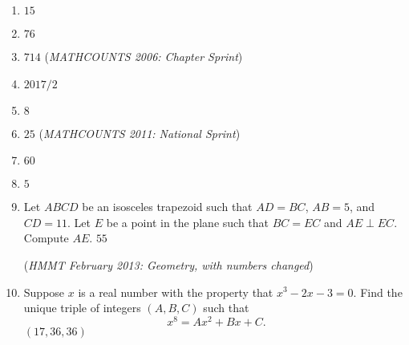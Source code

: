\documentclass{article}
\begin{document}
\begin{enumerate}
\item $15$\vspace{1cm}
\item $76$\vspace{1cm}
\item $714$ (\emph{MATHCOUNTS 2006: Chapter Sprint})\vspace{1cm}
\item $2017/2$\vspace{1cm}
\item $8$\vspace{1cm}
\item $25$ (\emph{MATHCOUNTS 2011: National Sprint})\vspace{1cm}
\item $60$\vspace{1cm}
\item $5$\vspace{1cm}
\item Let $ABCD$ be an isosceles trapezoid such that $AD = BC$, $AB = 5$, and $CD = 11$. Let $E$ be a point in the plane such that $BC = EC$ and $AE\perp EC$. Compute $AE$. $\boxed{55}$\par (\emph{HMMT February 2013: Geometry, with numbers changed})
\vspace{1cm}
\item Suppose $x$ is a real number with the property that $x^3 - 2x - 3 = 0$. Find the unique triple of integers $(A,B,C)$ such that
\begin{equation*}
x^8 = Ax^2 + Bx + C.
\end{equation*}
$\boxed{(17,36,36)}$
\end{enumerate}
\end{document}
